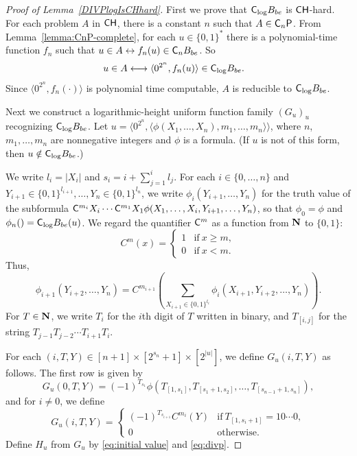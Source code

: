 \begin{proof}[\textup{Proof of Lemma~\ref{DIVPlogIsCHhard}}]
First we prove that $\mathsf{C}_{\log} B_{be}$ is $\mathsf{CH}$-hard.
For each problem $A$ in $\mathsf{CH}$, there is a constant $n$ such that $A \in \mathsf{C}_n \mathsf{P}$.
From Lemma~\ref{lemma:CnP-complete}, for each $u \in \{0,1\}^*$
there is a polynomial-time function $f_n$ such that
$u \in A \leftrightarrow f_n(u) \in \mathsf{C}_n B_{be}$. So
\begin{align}
 u \in A 
 & \longleftrightarrow \langle 0^{2^n}, f_n(u) \rangle \in \mathsf{C}_{\log} B_{be}.
\end{align}
Since $\langle 0^{2^n}, f_n(\cdot) \rangle$ is polynomial time computable,
$A$ is reducible to $\mathsf{C}_{\log} B_{be}$.


Next we construct a logarithmic-height uniform function family $(G_u)_u$
recognizing $\mathsf{C}_{\log} B_{be}$.
Let $u  = \langle 0^{2^n}, 
\langle \phi(X_1, \dots, X_n), m_1, \dots, m_n \rangle \rangle$, 
where $n$, $m_1, \dots, m_n$ are nonnegative integers 
and $\phi$ is a formula. 
(If $u$ is not of this form, then $u \notin \mathsf{C}_{\log} B_{be}$.)
 
We write $l_i = |X_i|$ and $s_i = i + \sum^i_{j=1}l_j$.
For each $i \in \{0, \dots, n\}$ and
$Y_{i+1} \in \{0,1\}^{l_{i+1}}, \dots, Y_n \in \{0,1\}^{l_n}$,
we write $\phi_i(Y_{i+1}, \dots, Y_n)$ for the truth value of the subformula
$\mathsf{C}^{m_{i}}{X_i} \cdots \mathsf{C}^{m_1}{X_1} \phi(X_1, \dots, X_i, Y_{i+1}, \dots, Y_n)$,
so that $\phi_0 = \phi$ and $\phi_n() = \mathsf{C}_{\log} B_{be} (u)$.
We regard the quantifier $\mathsf{C}^m$ as a function from $\mathbf N$ to $\{0,1\}$:
\begin{equation}
 C^m(x) 
  = \begin{cases}
     1 & \text{if} \ x \ge m, \\
     0 & \text{if} \ x < m.
    \end{cases}
\end{equation}
Thus,
\begin{equation} \label{eq:phi-step}
 \phi_{i+1}(Y_{i+2}, \dots, Y_n) 
  = C^{m_{i+1}}\left(\sum_{X_{i+1} \in \{ 0,1 \} ^{l_i}}
		\phi_i(X_{i+1}, Y_{i+2}, \dots, Y_{n})\right).
\end{equation}
For $T \in \mathbf N$, we write $T_i$ for the $i$th digit of $T$ written in binary,
and $T_{[i,j]}$ for the string $T_{j-1} T_{j-2} \cdots T_{i+1} T_{i}$.

For each $(i, T, Y) \in [n+1] \times [2^{s_n}+1] \times [2^{|u|}]$,
we define $G_u (i, T, Y)$ as follows.
The first row is given by
 \begin{equation}\label{eq:def-Gu:case0}
  G_u(0,T,Y) = 
   (-1)^{T_{s_1}}\phi(T_{[1,s_1]}, T_{[s_1+1,s_2]},
    \dots, T_{[s_{n-1}+1,s_n]}), 
 \end{equation}
and for $i \neq 0$, we define 
 \begin{equation} 
  G_u(i,T,Y) = 
   \begin{cases}
    (-1)^{T_{s_{i+1}}} C^{m_i}(Y) 
    & \text{if} \ T_{[1,s_i+1]} = 10 \cdots 0, \\
    0 & \text{otherwise}.
   \end{cases} 
 \end{equation}
Define $H_u$ from $G_u$ by \eqref{eq:initial value} and \eqref{eq:divp}.


\end{proof}
